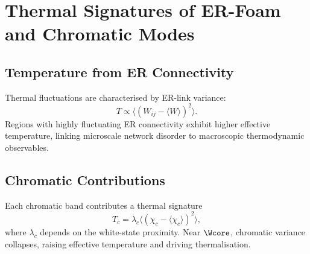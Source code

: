 \chapter{Thermal Signatures of ER-Foam and Chromatic Modes}

\section{Temperature from ER Connectivity}

Thermal fluctuations are characterised by ER-link variance:
\[
T \propto \langle (W_{ij} - \langle W\rangle)^2 \rangle.
\]
Regions with highly fluctuating ER connectivity exhibit higher effective temperature, linking microscale network disorder to macroscopic thermodynamic observables.

\section{Chromatic Contributions}

Each chromatic band contributes a thermal signature
\[
T_c = \lambda_c \langle (\chi_c - \langle\chi_c\rangle)^2\rangle,
\]
where $\lambda_c$ depends on the white-state proximity.
Near $\Wcore$, chromatic variance collapses, raising effective temperature and driving thermalisation.

